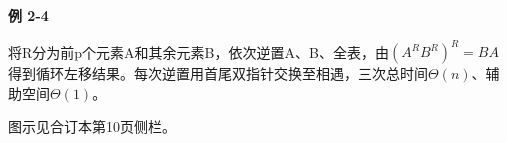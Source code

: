{\color{ink}\bfseries 例 2-4}\par\vspace{1bp}将R分为前p个元素A和其余元素B，依次逆置A、B、全表，由\((A^{R}B^{R})^{R}=\allowbreak{}BA\)得到循环左移结果。每次逆置用首尾双指针交换至相遇，三次总时间\(\Theta (n)\)、辅助空间\(\Theta (1)\)。\par {\color{ink}图示见合订本第10页侧栏。}
